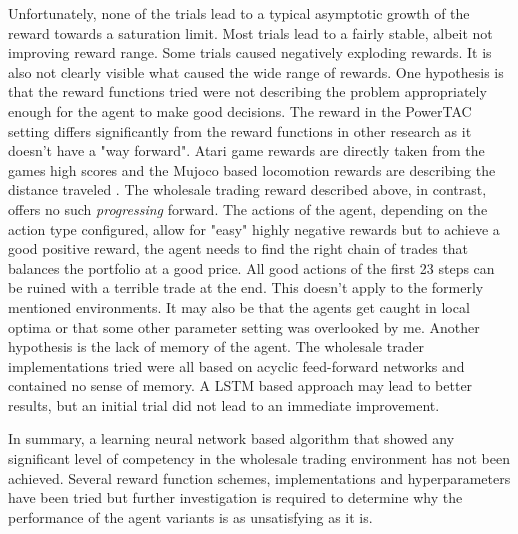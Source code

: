 Unfortunately, none of the trials lead to a typical asymptotic growth of the reward towards a saturation limit. Most
trials lead to a fairly stable, albeit not improving reward range. Some trials caused negatively exploding rewards.
It is also not clearly visible what caused the wide range of rewards. One hypothesis is that the reward functions tried
were not describing the problem appropriately enough for the agent to make good decisions. The reward in the
\ac{PowerTAC} setting differs significantly from the reward functions in other research as it doesn't have a "way
forward". Atari game rewards are directly taken from the games high scores and the Mujoco based locomotion rewards are
describing the distance traveled \cite[]{heess2017emergence}. The wholesale trading reward described above, in contrast, offers no
such \emph{progressing} forward. The actions of the agent, depending on the action type configured, allow for "easy" highly
negative rewards but to achieve a good positive reward, the agent needs to find the right chain of trades that balances
the portfolio at a good price. All good actions of the first 23 steps can be ruined with a terrible trade at the end.
This doesn't apply to the formerly mentioned environments. It may also be that the agents get caught in local optima or that
some other parameter setting was overlooked by me. Another hypothesis is the lack of memory of the agent. The wholesale
trader implementations tried were all based on acyclic feed-forward networks and contained no sense of memory.
A \ac{LSTM} based approach may lead to better results, but an initial trial did not lead to an immediate improvement.

In summary, a learning neural network based algorithm that showed any significant level of
competency in the wholesale trading environment has not been achieved. Several reward function schemes, implementations
and hyperparameters have been tried but further investigation is required to determine why the performance of the agent
variants is as unsatisfying as it is.





